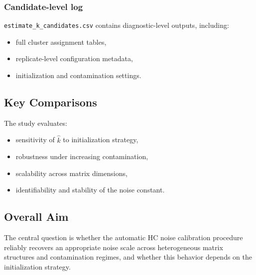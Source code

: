 \documentclass[11pt]{article}
\begin{document}
\subsubsection{Candidate-level log}

\texttt{estimate\_k\_candidates.csv} contains diagnostic-level outputs, including:
\begin{itemize}
    \item full cluster assignment tables,
    \item replicate-level configuration metadata,
    \item initialization and contamination settings.
\end{itemize}

\subsection{Key Comparisons}

The study evaluates:

\begin{itemize}
    \item sensitivity of $\hat{k}$ to initialization strategy,
    \item robustness under increasing contamination,
    \item scalability across matrix dimensions,
    \item identifiability and stability of the noise constant.
\end{itemize}

\subsection{Overall Aim}

The central question is whether the automatic HC noise calibration procedure reliably recovers an appropriate noise scale across heterogeneous matrix structures and contamination regimes, and whether this behavior depends on the initialization strategy.
\end{document}
